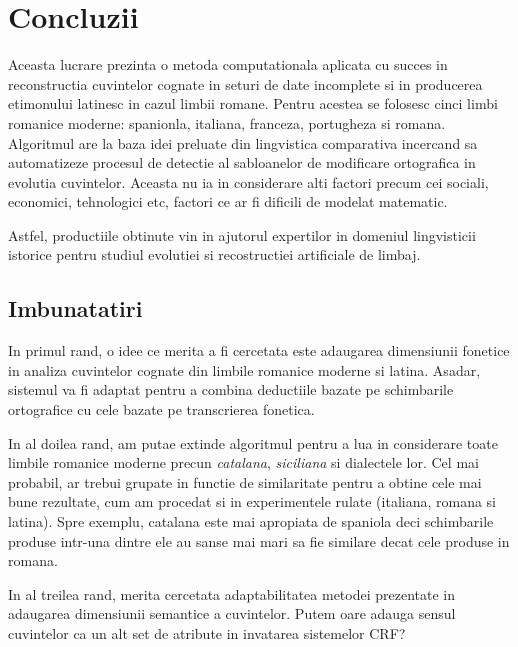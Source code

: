 \chapter{Concluzii}
Aceasta lucrare prezinta o metoda computationala aplicata cu succes in reconstructia cuvintelor 
cognate in seturi de date incomplete si in producerea etimonului latinesc in cazul limbii romane.
Pentru acestea se folosesc cinci limbi romanice moderne: spanionla, italiana, franceza, portugheza
si romana. Algoritmul are la baza idei preluate din lingvistica comparativa incercand sa automatizeze
procesul de detectie al sabloanelor de modificare ortografica in evolutia cuvintelor. Aceasta nu ia
in considerare alti factori precum cei sociali, economici, tehnologici etc, factori ce ar fi dificili
de modelat matematic.

Astfel, productiile obtinute vin in ajutorul expertilor in domeniul lingvisticii istorice pentru
studiul evolutiei si recostructiei artificiale de limbaj.

\section{Imbunatatiri}
In primul rand, o idee ce merita a fi cercetata este adaugarea dimensiunii fonetice in analiza 
cuvintelor cognate din limbile romanice moderne si latina. Asadar, sistemul va fi adaptat pentru a 
combina deductiile bazate pe schimbarile ortografice cu cele bazate pe transcrierea fonetica.

In al doilea rand, am putae extinde algoritmul pentru a lua in considerare toate limbile romanice
moderne precun \textit{catalana}, \textit{siciliana} si dialectele lor. Cel mai probabil, ar trebui
grupate in functie de similaritate pentru a obtine cele mai bune rezultate, cum am procedat si in 
experimentele rulate (italiana, romana si latina). Spre exemplu, catalana este mai apropiata de 
spaniola deci schimbarile produse intr-una dintre ele au sanse mai mari sa fie similare decat
cele produse in romana.

In al treilea rand, merita cercetata adaptabilitatea metodei prezentate in adaugarea dimensiunii 
semantice a cuvintelor. Putem oare adauga sensul cuvintelor ca un alt set de atribute in invatarea
sistemelor CRF?


